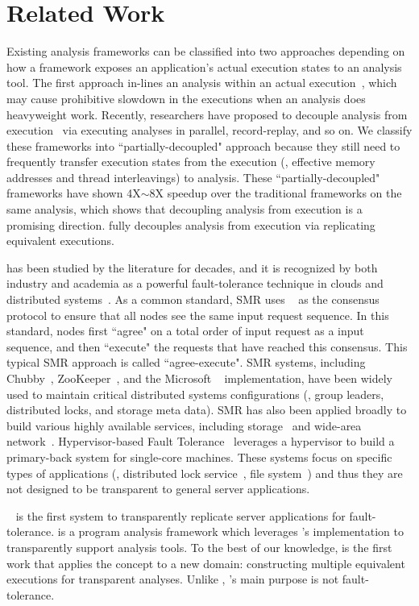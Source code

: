 \section{Related Work} \label{sec:related}

Existing analysis frameworks can be classified into two approaches depending 
on how a framework exposes an application's actual execution states to an 
analysis tool. The first approach in-lines an analysis within an 
actual execution~\cite{dynamorio, pin:pldi05, 
valgrind:pldi, lift:micro06, tsan}, which may cause prohibitive slowdown in the
executions when an analysis does heavyweight work. Recently, researchers have
proposed to 
decouple analysis from execution~\cite{decouple:usenix08, speck:asplos08, 
shadowreplica:ccs13, wester:parallelizing:asplos13, superpin, jungwoo:oopsla09} 
via executing analyses in parallel, record-replay, and so on. We classify these
frameworks into ``partially-decoupled" approach because they still need to
frequently 
transfer execution states from the execution (\eg, effective memory addresses 
and thread interleavings) to analysis. These ``partially-decoupled" frameworks 
have shown 4X$\sim$8X speedup over the traditional frameworks on the same 
analysis, which shows that decoupling analysis from execution is a promising 
direction. \xxx fully decouples analysis from execution via replicating 
equivalent executions.

\smr has been studied by the literature for decades, and it is recognized by 
both industry and academia as a powerful fault-tolerance technique in clouds 
and distributed systems~\cite{lamportclock, smr:tutorial}. As a common 
standard, SMR uses \paxos~\cite{paxos} as the consensus protocol to ensure that 
all nodes see the same input request sequence. In this standard, nodes first 
``agree" on a total order of input request as a input sequence, and then 
``execute" the requests that have reached this consensus. This typical SMR 
approach is called ``agree-execute". SMR systems, including 
Chubby~\cite{chubby:osdi}, ZooKeeper~\cite{zookeeper}, and 
the Microsoft \paxos~\cite{paxos} implementation, have been widely used to 
maintain critical distributed systems configurations (\eg, group leaders, 
distributed locks, and storage meta data). SMR has also been applied broadly to 
build various highly available services, including 
storage~\cite{paxos:datastore} and wide-area network~\cite{mencius:osdi08}. 
Hypervisor-based Fault Tolerance~\cite{hft:sosp95} leverages a hypervisor to 
build a primary-back system for single-core machines. These systems focus on 
specific types of applications (\eg, distributed lock service~\cite{chubby:osdi}, file 
system~\cite{zookeeper}) and thus they are not designed to be transparent to 
general server applications.

\repbox~\cite{repbox:sosp15} is the first \smr system to transparently 
replicate server applications for fault-tolerance. \xxx is a program analysis 
framework which leverages \repbox's \paxos implementation to transparently support analysis tools. To the best of our knowledge, \xxx is the first work that applies the \smr concept to a new domain: constructing multiple equivalent executions for transparent analyses. Unlike \repbox, \xxx's main purpose is not fault-tolerance.

